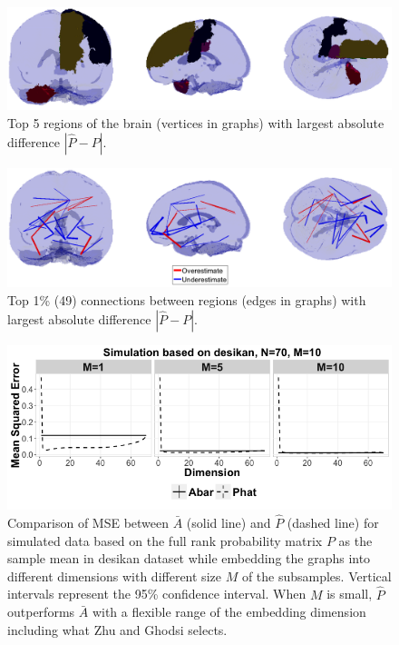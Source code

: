\documentclass[a4paper]{article}
\begin{document}
\begin{figure}[!htb]
\centering
\includegraphics[width=1\textwidth]{Vertex_Diff_Phat_desikan.png}
\caption{Top 5 regions of the brain (vertices in graphs) with largest absolute difference $|\hat{P} - P|$.}
\label{fig:Vertex_Diff_Phat_desikan}
\end{figure}

\begin{figure}[!htb]
\centering
\includegraphics[width=1\textwidth]{Edge_Diff_Phat_desikan.png}
\caption{Top 1\% (49) connections between regions (edges in graphs) with largest absolute difference $|\hat{P} - P|$.}
\label{fig:Vertex_Diff_Phat_desikan}
\end{figure}



\begin{figure}[!htb]
\centering
\includegraphics[width=1\textwidth]{sim_desikan.png}
\caption{Comparison of MSE between $\bar{A}$ (solid line) and $\hat{P}$ (dashed line) for simulated data based on the full rank probability matrix $P$ as the sample mean in desikan dataset while embedding the graphs into different dimensions with different size $M$ of the subsamples. Vertical intervals represent the 95\% confidence interval. When $M$ is small, $\hat{P}$ outperforms $\bar{A}$ with a flexible range of the embedding dimension including what Zhu and Ghodsi selects.}
\label{fig:sim_desikan}
\end{figure}
\end{document}
